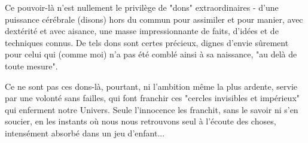Ce pouvoir-là n'est nullement le privilège de "dons" extraordinaires - d'une puissance cérébrale (disons) hors du commun pour assimiler et pour manier, avec dextérité et avec aisance, une masse impressionnante de faits, d'idées et de techniques connus. De tels dons sont certes précieux, dignes d'envie sûrement pour celui qui (comme moi) n'a pas été comblé ainsi à sa naissance, "au delà de toute mesure".

Ce ne sont pas ces dons-là, pourtant, ni l'ambition même la plus ardente, servie par une volonté sans failles, qui font franchir ces "cercles invisibles et impérieux" qui enferment notre Univers. Seule l'innocence les franchit, sans le savoir ni s'en soucier, en les instants où nous nous retrouvons seul à l'écoute des choses, intensément absorbé dans un jeu d'enfant...


